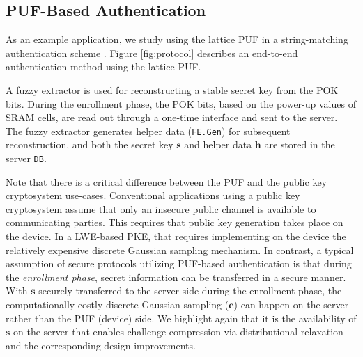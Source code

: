 \subsection{PUF-Based Authentication}
As an example application, we study using the lattice PUF in a string-matching authentication scheme \cite{suh2007physical}. 
Figure \ref{fig:protocol} describes an end-to-end authentication method using the lattice PUF. 

A fuzzy extractor \cite{bosch2008efficient} is used for reconstructing a stable secret key from the POK bits.
During the enrollment phase, the POK bits, based on the power-up values of SRAM cells, are read out through a one-time interface and sent to the server. The fuzzy extractor generates helper data (\texttt{FE.Gen})
for subsequent reconstruction, and both the secret key $\mathbf{s}$ and helper data $\mathbf{h}$ are stored in the server \texttt{DB}.

Note that there is a critical difference between the PUF and the public key cryptosystem use-cases. Conventional applications using a public key cryptosystem assume that only an insecure public channel is available to communicating parties. 
This requires that public key generation takes place on the device. In a LWE-based PKE, that requires implementing on the device the relatively expensive discrete Gaussian sampling mechanism. In contrast, a typical assumption of secure protocols utilizing PUF-based authentication is that during the \emph{enrollment phase}, secret information can be transferred in a secure manner. With $\mathbf{s}$ securely transferred to the server side during the enrollment phase, the computationally costly discrete Gaussian sampling ($\mathbf{e}$) can happen on the server rather than the PUF (device) side.
We highlight again that it is the availability of $\mathbf{s}$ on the server that enables challenge compression via distributional relaxation and the corresponding design improvements. 

